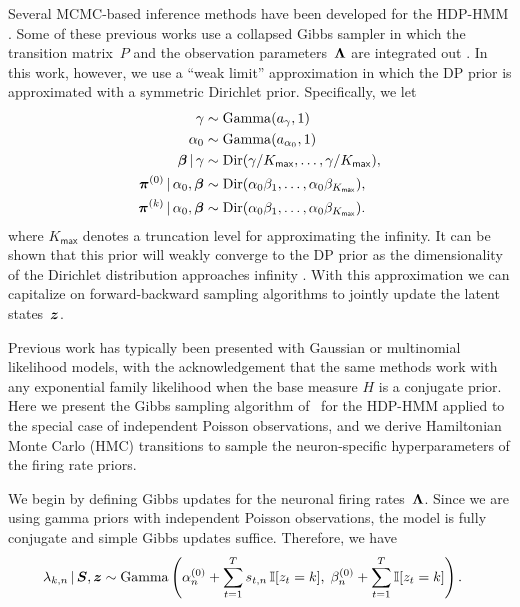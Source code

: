 Several MCMC-based inference methods have been developed for the
HDP-HMM \citep{Beal02,Teh06,van08}. Some of these previous works use a
collapsed Gibbs sampler in which the transition matrix~$P$ and the
observation parameters~$\boldsymbol{\Lambda}$ are integrated out
\citep{Teh06,van08}. In this work, however, we use a ``weak limit''
approximation in which the DP prior is approximated with a symmetric
Dirichlet prior. Specifically, we let
\begin{align}
\label{eq:hdphmm_trans}
\gamma &\sim \mathrm{Gamma}(a_\gamma, 1) \\
\nonumber \alpha_0 &\sim \mathrm{Gamma}(a_{\alpha_0}, 1) \\
\nonumber \boldsymbol{\beta} \,|\, \gamma &\sim \mathrm{Dir}(\gamma/K_{\mathsf{max}}, \ldots, \gamma/K_{\mathsf{max}}), \\
\nonumber \boldsymbol{\pi}^{(0)} \,|\, \alpha_0, \boldsymbol{\beta} &\sim \mathrm{Dir}(\alpha_0 \beta_1, \ldots, \alpha_0 \beta_{K_{\mathsf{max}}}), \\
\nonumber \boldsymbol{\pi}^{(k)} \,|\, \alpha_0, \boldsymbol{\beta} &\sim \mathrm{Dir}(\alpha_0 \beta_1, \ldots, \alpha_0 \beta_{K_{\mathsf{max}}}).
\end{align}
where $K_{\mathsf{max}}$ denotes a truncation level for approximating the infinity.  It can be
shown that this prior will weakly converge to the DP prior as the
dimensionality of the Dirichlet distribution approaches infinity
\citep{Johnson14, Ishwaran02}. With this approximation we can
capitalize on forward-backward sampling algorithms to jointly update
the latent states~$\boldsymbol{z}$.

Previous work has typically been presented with Gaussian or
multinomial likelihood models, with the acknowledgement that the same
methods work with any exponential family likelihood when the base
measure $H$ is a conjugate prior.  Here we present the Gibbs sampling
algorithm of~\citep{Teh06} for the HDP-HMM applied to the special case
of independent Poisson observations, and we derive Hamiltonian Monte
Carlo (HMC) transitions to sample the neuron-specific hyperparameters of
the firing rate priors.

We begin by defining Gibbs updates for the neuronal firing
rates~$\boldsymbol{\Lambda}$. Since we are using gamma priors with independent
Poisson observations, the model is fully conjugate and simple Gibbs
updates suffice. Therefore, we have
\begin{align*}
\lambda_{k,n} \,|\, \boldsymbol{S}, \boldsymbol{z} 
  &\sim \mathrm{Gamma} \left(
    \alpha_n^{(0)} + \sum_{t=1}^T s_{t,n} \, \mathbb{I}[z_t=k], \; 
    \beta_n^{(0)} + \sum_{t=1}^T \mathbb{I}[z_t=k]
    \right).
\end{align*}

